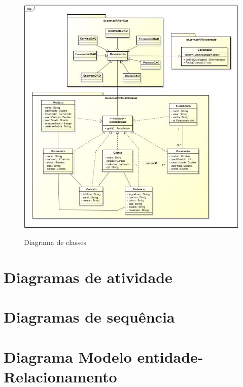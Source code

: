 \begin{anexosenv}
\begin{figure}[htp]
\centering
\caption{Diagrama de classes}
\includegraphics[width=18cm]{imagens/diagramas/DiagramaClasses}
\label{fig:Diagrama de classes}
\end{figure}

	
\chapter{Diagramas de atividade}

	
\chapter{Diagramas de sequência}


\chapter{Diagrama Modelo entidade-Relacionamento}


\end{anexosenv}
